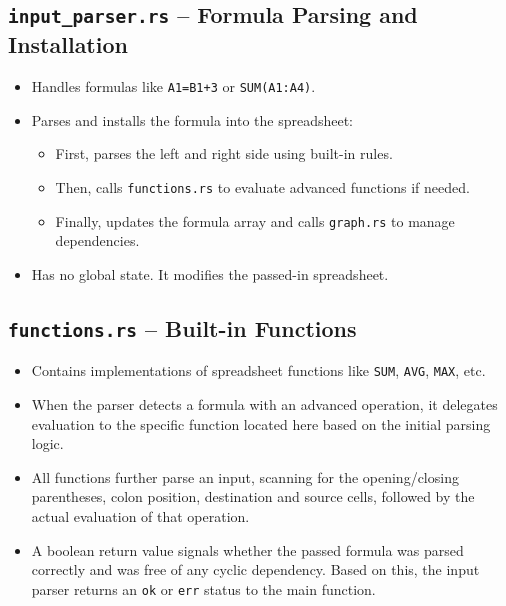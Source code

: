\documentclass[12pt]{article}
\begin{document}
    \subsection{\texttt{input\_parser.rs} – Formula Parsing and Installation}
    \begin{itemize}
        \item Handles formulas like \texttt{A1=B1+3} or \texttt{SUM(A1:A4)}.
        \item Parses and installs the formula into the spreadsheet:
        \begin{itemize}
            \item First, parses the left and right side using built-in rules.
            \item Then, calls \texttt{functions.rs} to evaluate advanced functions if needed.
            \item Finally, updates the formula array and calls \texttt{graph.rs} to manage dependencies.
        \end{itemize}
        \item Has no global state. It modifies the passed-in spreadsheet.
    \end{itemize}

    \subsection{\texttt{functions.rs} – Built-in Functions}
    \begin{itemize}
        \item Contains implementations of spreadsheet functions like \texttt{SUM}, \texttt{AVG}, \texttt{MAX}, etc.
        \item When the parser detects a formula with an advanced operation, it delegates evaluation to the specific function located here based on the initial parsing logic.
        \item All functions further parse an input, scanning for the opening/closing parentheses, colon position, destination and source cells, followed by the actual evaluation of that operation.
        \item A boolean return value signals whether the passed formula was parsed correctly and was free of any cyclic dependency. Based on this, the input parser returns an \texttt{ok} or \texttt{err} status to the main function.
    \end{itemize}
\end{document}
